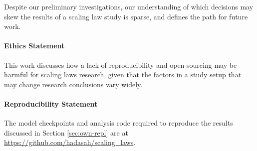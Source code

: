 Despite our preliminary investigations, our understanding of which decisions may skew the results of a scaling law study is sparse, and defines the path for future work.

\paragraph{Ethics Statement} This work discusses how a lack of reproducibility and open-sourcing may be harmful for scaling laws research, given that the factors in a study setup that may change research conclusions vary widely.

\paragraph{Reproducibility Statement} The model checkpoints and analysis code required to reproduce the results discussed in Section \ref{sec:own-repl} are at \url{https://github.com/hadasah/scaling_laws}.


